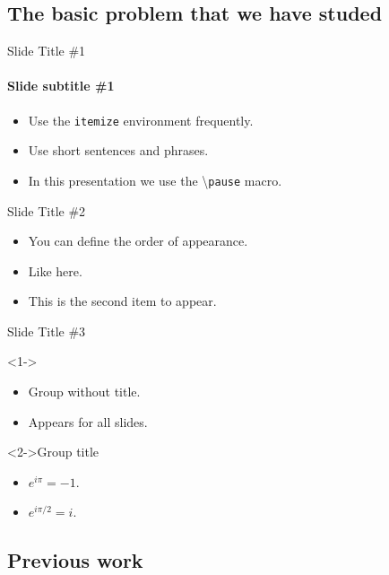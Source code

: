 \documentclass{beamer}
\begin{document}
\iffalse

\subsection[Basic Problem]{The basic problem that we have studed}

\begin{frame}{Slide Title \#1}
	\framesubtitle{Slide subtitle \#1}
	\begin{itemize}
		\item Use the \texttt{itemize} environment frequently.
		\pause
		\item Use short sentences and phrases.
		\pause
		\item In this presentation we use the \textbackslash{}\texttt{pause} macro.
	\end{itemize}
\end{frame}

\begin{frame}{Slide Title \#2}
	\begin{itemize}
		\item <1->You can define the order of appearance.
		\item <3->Like here.
		\item <2->This is the second item to appear.
	\end{itemize}
\end{frame}

\begin{frame}{Slide Title \#3}
	\begin{block}
		<1->{}
		\begin{itemize}
			\item Group without title.
			\item Appears for all slides.
		\end{itemize}
	\end{block}
	\begin{exampleblock}
		<2->{Group title}
		\begin{itemize}
			\item $e^{i\pi}=-1$.
			\item $e^{i\pi/2}=i$.
		\end{itemize}
	\end{exampleblock}
\end{frame}

\subsection{Previous work}
\end{document}
